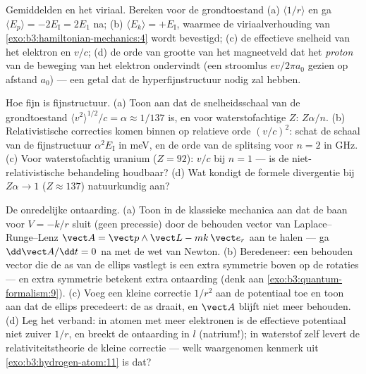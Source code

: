 \begin{exercise}[$\star\star\star$]\label{exo:b3:hydrogen-atom:10}
Gemiddelden en het viriaal. Bereken voor de grondtoestand (a)
$\langle 1/r\rangle$ en ga $\langle E_p\rangle = -2E_{\text{I}}
= 2E_1$
na; (b) $\langle E_k\rangle = +E_{\text{I}}$, waarmee de viriaalverhouding
van \cref{exo:b3:hamiltonian-mechanics:4} wordt bevestigd; (c) de
effectieve snelheid van het elektron en $v/c$; (d) de orde van grootte van het magneetveld dat het \emph{proton} van de
beweging van het elektron ondervindt (een stroomlus $ev/2\pi a_0$ gezien
op afstand $a_0$) --- een getal dat de hyperfijnstructuur nodig zal
hebben.
\end{exercise}

\begin{exercise}[$\star\star\star$]\label{exo:b3:hydrogen-atom:11}
Hoe fijn is fijnstructuur. (a) Toon aan dat de snelheidsschaal van de
grondtoestand $\langle v^2\rangle^{1/2}/c = \alpha \approx 1/137$ is, en
voor waterstofachtige $Z$: $Z\alpha/n$. (b) Relativistische correcties
komen binnen op relatieve orde $(v/c)^2$: schat de schaal van de
fijnstructuur $\alpha^2E_{\text{I}}$ in meV, en de orde van de splitsing
voor $n = 2$ in GHz. (c) Voor waterstofachtig uranium ($Z = 92$): $v/c$
bij $n = 1$ --- is de niet-relativistische behandeling houdbaar? (d) Wat
kondigt de formele divergentie bij $Z\alpha \to 1$ ($Z \approx 137$)
natuurkundig aan?
\end{exercise}

\begin{exercise}[$\star\star\star$]\label{exo:b3:hydrogen-atom:12}
De onredelijke ontaarding. (a) Toon in de klassieke mechanica aan dat de
baan voor $V = -k/r$ sluit (geen precessie) door de behouden vector van
Laplace--Runge--Lenz $\vect A = \vect p\wedge\vect
L - mk\,\vect e_r$ aan
te halen --- ga $\dd\vect A/\dd t = 0$ na met de wet van Newton. (b)
Beredeneer: een behouden vector die de as van de ellips vastlegt is een
extra symmetrie boven op de rotaties --- en extra symmetrie betekent extra
ontaarding (denk aan \cref{exo:b3:quantum-formalism:9}). (c) Voeg een
kleine correctie $1/r^2$ aan de potentiaal toe en toon aan dat de ellips
precedeert: de as draait, en $\vect A$ blijft niet meer behouden. (d) Leg
het verband: in atomen met meer elektronen is de effectieve potentiaal
niet zuiver $1/r$, en breekt de ontaarding in $l$ (natrium!); in waterstof
zelf levert de relativiteitstheorie de kleine correctie --- welk
waargenomen kenmerk uit \cref{exo:b3:hydrogen-atom:11} is dat?
\end{exercise}

